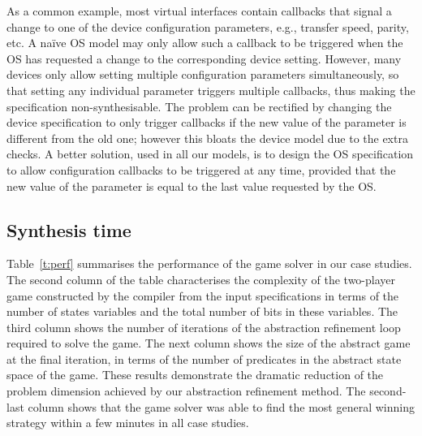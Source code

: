 As a common example, most virtual interfaces contain callbacks that signal a change to one of the device configuration parameters, e.g., transfer speed, parity, etc.  A na\"ive OS model may only allow such a callback to be triggered when the OS has requested a change to the corresponding device setting.  However, many devices only allow setting multiple configuration parameters simultaneously, so that setting any individual parameter triggers multiple callbacks, thus making the specification non-synthesisable.  The problem can be rectified by changing the device specification to only trigger callbacks if the new value of the parameter is different from the old one; however this bloats the device model due to the extra checks.  A better solution, used in all our models, is to design the OS specification to allow configuration callbacks to be triggered at any time, provided that the new value of the parameter is equal to the last value requested by the OS. 

\subsection{Synthesis time} 
Table~\ref{t:perf} summarises the performance of the \termite game solver in our case studies.  The second column of the table characterises the complexity of the two-player game constructed by the \tsl compiler from the input specifications in terms of the number of states variables and the total number of bits in these variables.  The third column shows the number of iterations of the abstraction refinement loop required to solve the game.  The next column shows the size of the abstract game at the final iteration, in terms of the number of predicates in the abstract state space of the game.  These results demonstrate the dramatic reduction of the problem dimension achieved by our abstraction refinement method.  The second-last column shows that the \termite game solver was able to find the most general winning strategy within a few minutes in all case studies.

